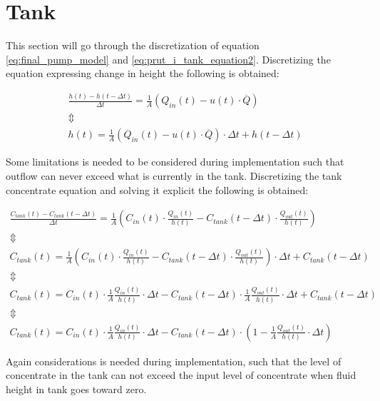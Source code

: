 \section{Tank}\label{sec:tank}

This section will go through the discretization of equation \ref{eq:final_pump_model} and \ref{eq:prut_i_tank_equation2}.
Discretizing the equation expressing change in height the following is obtained:

\begin{equation}\label{eq:disc_tank}
\begin{array}{l}
	\frac{h(t)-h(t-\Delta t)}{\Delta t} = \frac{1}{A} (Q_{in}(t) - u(t)\cdot \overline Q) \\
	\Updownarrow \\
	h(t) = \frac{1}{A} (Q_{in}(t) - u(t)\cdot \overline Q) \cdot \Delta t + h(t-\Delta t)	
\end{array}
\end{equation}

Some limitations is needed to be considered during implementation such that outflow can never exceed what is currently in the tank.
Discretizing the tank concentrate equation and solving it explicit the following is obtained:

\begin{equation}\label{eq:disc_con_tank}
\begin{array}{l}
	\frac{C_{tank}(t)-C_{tank}(t-\Delta t)}{\Delta t} = \frac{1}{A} \left(C_{in}(t) \cdot \frac{Q_{in}(t)}{h(t)} - C_{tank}(t - \Delta t) \cdot \frac{Q_{out}(t)}{h(t)} \right) \\
	
	\Updownarrow \\
	
	C_{tank}(t) = \frac{1}{A} \left(C_{in}(t) \cdot \frac{Q_{in}(t)}{h(t)} - C_{tank}(t - \Delta t) \cdot \frac{Q_{out}(t)}{h(t)} \right) \cdot \Delta t + C_{tank}(t-\Delta t) \\

	\Updownarrow \\

	C_{tank}(t) =  C_{in}(t) \cdot \frac{1}{A} \frac{Q_{in}(t)}{h(t)} \cdot \Delta t -  C_{tank}(t - \Delta t) \cdot \frac{1}{A} \frac{Q_{out}(t)}{h(t)} \cdot \Delta t + C_{tank}(t - \Delta t) \\

	\Updownarrow \\

	C_{tank}(t) =   C_{in}(t) \cdot \frac{1}{A} \frac{Q_{in}(t)}{h(t)} \cdot \Delta t -  C_{tank}(t - \Delta t) \cdot \left( 1 - \frac{1}{A} \frac{Q_{out}(t)}{h(t)} \cdot \Delta t \right)

\end{array}
\end{equation}

Again considerations is needed during implementation, such that the level of concentrate in the tank can not exceed the input level of concentrate when fluid height in tank goes toward zero.


